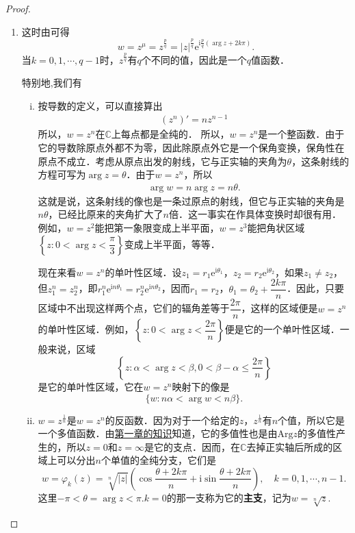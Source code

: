 \documentclass[../../main.tex]{subfiles}%
\begin{document}
\begin{proof}
\begin{enumerate}[(1)]
\item 这时由可得
\[
w = z^\mu = z^{\frac{p}{q}} = |z|^{\frac{p}{q}} \text{e}^{\text{i}\frac{p}{q}(\arg z + 2k\pi)}.
\]
当$k = 0,1,\cdots,q - 1$时，$z^{\frac{p}{q}}$有$q$个不同的值，因此是一个$q$值函数．

特别地,我们有
\begin{enumerate}[(i)]
\item 按导数的定义，可以直接算出
\begin{align*}
(z^n)' = nz^{n - 1}
\end{align*}
所以，$w = z^n$在$\mathbb{C}$上每点都是全纯的．
所以，$w = z^n$是一个整函数．由于它的导数除原点外都不为零，因此除原点外它是一个保角变换，保角性在原点不成立．考虑从原点出发的射线，它与正实轴的夹角为$\theta$，这条射线的方程可写为$\arg z = \theta$．由于$w = z^n$，所以
\begin{align*}
\arg w = n\arg z = n\theta.
\end{align*}
这就是说，这条射线的像也是一条过原点的射线，但它与正实轴的夹角是$n\theta$，已经比原来的夹角扩大了$n$倍．这一事实在作具体变换时却很有用．例如，$w = z^2$能把第一象限变成上半平面，$w = z^3$能把角状区域$\left\{ z: 0 < \arg z < \dfrac{\pi}{3} \right\}$变成上半平面，等等．

现在来看$w = z^n$的单叶性区域．设$z_1 = r_1\text{e}^{\text{i}\theta_1}$，$z_2 = r_2\text{e}^{\text{i}\theta_2}$，如果$z_1 \neq z_2$，但$z_1^n = z_2^n$，即$r_1^n\text{e}^{\text{i}n\theta_1} = r_2^n\text{e}^{\text{i}n\theta_2}$，因而$r_1 = r_2$，$\theta_1 = \theta_2 + \dfrac{2k\pi}{n}$．因此，只要区域中不出现这样两个点，它们的辐角差等于$\dfrac{2\pi}{n}$，这样的区域便是$w = z^n$的单叶性区域．例如，$\left\{ z: 0 < \arg z < \dfrac{2\pi}{n} \right\}$便是它的一个单叶性区域．一般来说，区域
\[
\left\{ z: \alpha < \arg z < \beta, 0 < \beta - \alpha \leqslant \dfrac{2\pi}{n} \right\}
\]
是它的单叶性区域，它在$w = z^n$映射下的像是
\[
\{ w: n\alpha < \arg w < n\beta \}.
\]

\item 
$w = z^{\frac{1}{n}}$是$w = z^n$的反函数．因为对于一个给定的$z$，$z^{\frac{1}{n}}$有$n$个值，所以它是一个多值函数．由\hyperref[section:复数的几何表示]{第一章的知识}知道，它的多值性也是由$\text{Arg}z$的多值性产生的，所以$z = 0$和$z = \infty$是它的支点．因而，在$\mathbb{C}$去掉正实轴后所成的区域上可以分出$n$个单值的全纯分支，它们是
\[
w = \varphi_k(z) = \sqrt[n]{|z|} \left( \cos \dfrac{\theta + 2k\pi}{n} + \text{i}\sin \dfrac{\theta + 2k\pi}{n} \right),
\quad
k = 0,1,\cdots,n - 1.
\]
这里$-\pi < \theta =\arg z < \pi$.$k = 0$的那一支称为它的\textbf{主支}，记为$w = \sqrt[n]{z}$.


\end{enumerate}
\end{enumerate}
\end{proof}
\end{document}
